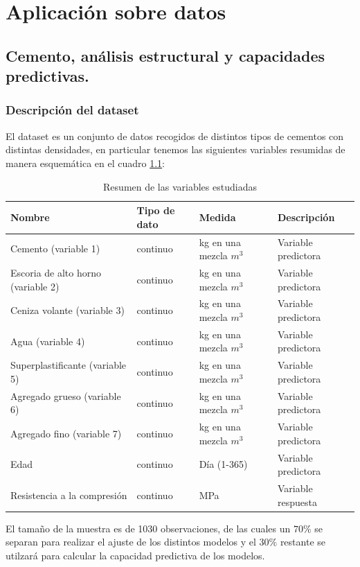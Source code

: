 \chapter{Aplicación sobre datos}

\section{Cemento, análisis estructural y capacidades predictivas.}
\subsection*{Descripción del dataset}
\noindent El dataset  \cite{Yeh 2007} es un conjunto de datos recogidos de distintos tipos de cementos con distintas densidades, en particular tenemos las siguientes variables resumidas de manera esquemática en el cuadro \ref{tab:Resumen Variables}:
\begin{table}[h]
\footnotesize
\centering
\begin{tabular}{|l|l|l|l|}
\hline
Nombre & Tipo de dato & Medida & Descripción \\
\hline
Cemento (variable 1) & continuo & kg en una mezcla $m^3$  & Variable predictora \\
Escoria de alto horno (variable 2) & continuo & kg en una mezcla $m^3$ & Variable predictora \\
Ceniza volante (variable 3) & continuo & kg en una mezcla $m^3$ & Variable predictora \\
Agua (variable 4) & continuo & kg en una mezcla $m^3$ & Variable predictora \\
Superplastificante (variable 5) & continuo & kg en una mezcla $m^3$ & Variable predictora \\
Agregado grueso (variable 6) & continuo & kg en una mezcla $m^3$ & Variable predictora \\
Agregado fino (variable 7) & continuo & kg en una mezcla $m^3$ & Variable predictora \\
Edad & continuo & Día (1-365) & Variable predictora \\
Resistencia a la compresión & continuo & MPa & Variable respuesta \\
\hline
\end{tabular}
\caption{Resumen de las variables estudiadas}
\label{tab:Resumen Variables}
\end{table}




\noindent El tamaño de la muestra es de 1030 observaciones, de las cuales un $70\%$ se separan para realizar el ajuste de los distintos modelos y el $30\%$ restante se utilzará para calcular la capacidad predictiva de los modelos. 

